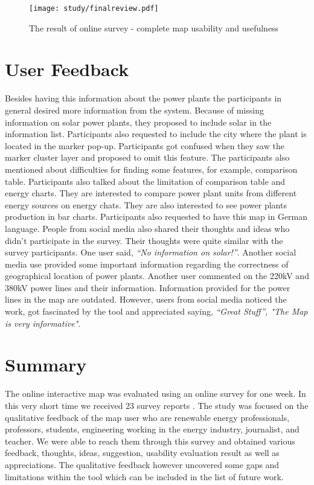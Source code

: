 \begin{figure} 
  \begin{center}
    \texttt{[image: study/finalreview.pdf]}
    \caption{The result of online survey - complete map usability and usefulness}
    \label{fig:finalRev}
  \end{center}
\end{figure}

\section{User Feedback}

Besides having this information about the power plants the participants in general desired more information from the system. Because of missing information on solar power plants, they proposed to include solar in the information list. Participants also requested to include the city where the plant is located in the marker pop-up. Participants got confused when they saw the marker cluster layer and proposed to omit this feature. The participants also mentioned about difficulties for finding some features, for example, comparison table. Participants also talked about the limitation of comparison table and energy charts. They are interested to compare power plant units from different energy sources on energy chats. They are also interested to see power plants production in bar charts. Participants also requested to have this map in German language. People from social media also shared their thoughts and ideas who didn't participate in the survey. Their thoughts were quite similar with the survey participants. One user said, \textit{“No information on solar!”}. Another social media use provided some important information regarding the correctness of geographical location of power plants.   Another user commented on the 220kV and 380kV power lines and their information. Information provided for the power lines in the map are outdated. However, users from social media noticed the work, got fascinated by the tool and appreciated saying, \textit{“Great Stuff”, "The Map is very informative"}.  

\section{Summary}

The online interactive map was evaluated using an online survey for one week. In this very short time we received 23 survey reports . The study was focused on the qualitative feedback of the map user who are renewable energy professionals, professors, students, engineering working in the energy industry, journalist, and teacher. We were able to reach them through this survey and obtained various feedback, thoughts, ideas, suggestion, usability evaluation result as well as appreciations. The qualitative feedback however uncovered some gaps and limitations within the tool which can be included in the list of future work.
